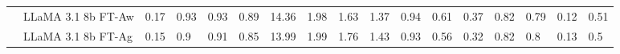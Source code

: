 \begin{table*}[t]
{\begin{tabular}{@{}ll|llll|llll|lll|ll|ll@{}}
                           & LLaMA 3.1 8b FT-Aw   & 0.17                                                                    & 0.93                                                                     & 0.93                                                                  & 0.89                                                                  & 14.36                                                                   & 1.98                                                                  & 1.63                                                                  & 1.37                                                                   & 0.94                                                                    & 0.61                                                                  & 0.37                                                                   & 0.82                                                                   & 0.79                                                                   & 0.12                                                                     & 0.51                                                                     \\
                           & LLaMA 3.1 8b FT-Ag   & 0.15                                                                    & 0.9                                                                      & 0.91                                                                  & 0.85                                                                  & 13.99                                                                   & 1.99                                                                  & 1.76                                                                  & 1.43                                                                   & 0.93                                                                    & 0.56                                                                  & 0.32                                                                   & 0.82                                                                   & 0.8                                                                    & 0.13                                                                     & 0.5                                                                      \\

\end{tabular}}
\end{table*}
